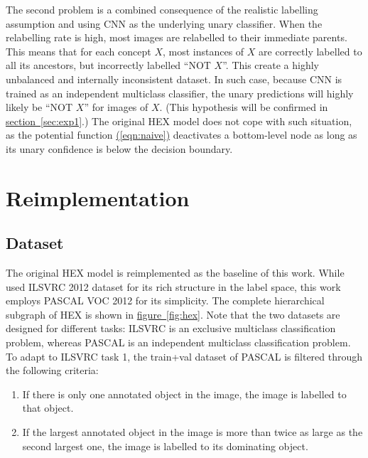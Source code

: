 \documentclass[11pt,a4paper]{article}
\begin{document}
The second problem is a combined consequence of the realistic labelling assumption and using CNN as the underlying unary classifier. When the relabelling rate is high, most images are relabelled to their immediate parents. This means that for each concept $X$, most instances of $X$ are correctly labelled to all its ancestors, but incorrectly labelled ``NOT $X$''. This create a highly unbalanced and internally inconsistent dataset. In such case, because CNN is trained as an independent multiclass classifier, the unary predictions will highly likely be ``NOT $X$'' for images of $X$. (This hypothesis will be confirmed in \hyperref[sec:exp1]{section~\ref{sec:exp1}}.) The original HEX model does not cope with such situation, as the potential function \hyperref[eqn:naive]{(\ref{eqn:naive})} deactivates a bottom-level node as long as its unary confidence is below the decision boundary.

\clearpage
\section{Reimplementation}
\subsection{Dataset}
\label{sec:data}

The original HEX model is reimplemented as the baseline of this work. While \cite{deng2014large} used ILSVRC 2012 dataset for its rich structure in the label space, this work employs PASCAL VOC 2012 \cite{pascal-voc-2012} for its simplicity. The complete hierarchical subgraph of HEX is shown in \hyperref[fig:hex]{figure~\ref{fig:hex}}. Note that the two datasets are designed for different tasks: ILSVRC is an exclusive multiclass classification problem, whereas PASCAL is an independent multiclass classification problem. To adapt to ILSVRC task 1, the train+val dataset of PASCAL is filtered through the following criteria:
\begin{enumerate}
\item If there is only one annotated object in the image, the image is labelled to that object.
\item If the largest annotated object in the image is more than twice as large as the second largest one, the image is labelled to its dominating object.
\end{enumerate}
\end{document}
